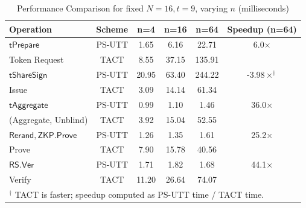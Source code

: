 \begin{table}[!htbp]
\centering
\caption[Threshold ABC Performance Comparison, fixed number of nodes, varying attribute length]{Performance Comparison for fixed $ N = 16, t = 9 $, varying $n$ (milliseconds)}
\begin{tabular}{lccccc}
\toprule
\textbf{Operation} & \textbf{Scheme} & \textbf{n=4} & \textbf{n=16} & \textbf{n=64} & \textbf{Speedup (n=64)} \\
\midrule
$\mathsf{tPrepare}$ & PS-UTT & 1.65 & 6.16 & 22.71 & 6.0$\times$ \\
Token Request       & TACT   & 8.55 & 37.15 & 135.91 & \\
\midrule
$\mathsf{tShareSign}$      & PS-UTT & 20.95 & 63.40 & 244.22 & -3.98$\times^\dagger$ \\
Issue             & TACT   & 3.09 & 14.14 & 61.34 & \\
\midrule
$\mathsf{tAggregate}$ & PS-UTT & 0.99 & 1.10 & 1.46 & 36.0$\times$ \\
(Aggregate, Unblind)                     & TACT   & 3.92 & 15.04 & 52.55 & \\
\midrule
$\mathsf{Rerand, ZKP.Prove}$         & PS-UTT & 1.26 & 1.35 & 1.61 & 25.2$\times$ \\
Prove             & TACT   & 7.90 & 15.78 & 40.56 & \\
\midrule
$\mathsf{RS.Ver}$         & PS-UTT & 1.71 & 1.82 & 1.68 & 44.1$\times$ \\
Verify             & TACT   & 11.20 & 26.64 & 74.07 & \\
\bottomrule
\multicolumn{6}{l}{\small $^\dagger$ TACT is faster; speedup computed as PS-UTT time / TACT time.}
\end{tabular}
\label{tab:perf-comp-vary-n}
\end{table}

\vspace{-0.5em}

